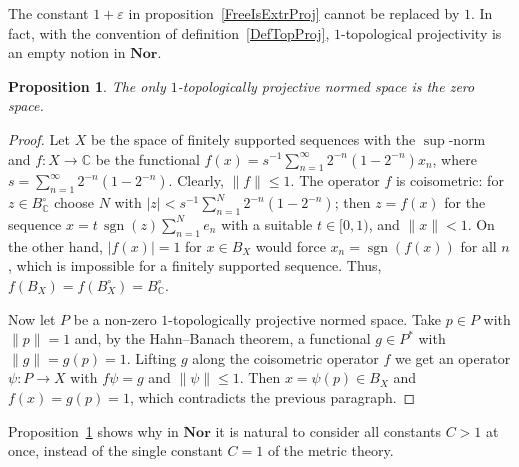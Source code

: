\documentclass[12pt]{article}
\newtheorem{proposition}[theorem]{Proposition}
\newcommand{\Nor}{\mathbf{Nor}}
\newcommand{\norm}[1]{\lVert #1\rVert}
\begin{document}
The constant $1+\varepsilon$ in proposition~\ref{FreeIsExtrProj} cannot be
replaced by $1$. In fact, with the convention of
definition~\ref{DefTopProj}, $1$-topological projectivity is an empty notion
in $\Nor$.

\begin{proposition}\label{NoOneTopProj} The only $1$-topologically projective
    normed space is the zero space.
\end{proposition}
\begin{proof} Let $X$ be the space of finitely supported sequences with the
    $\sup$-norm and $f:X\to\mathbb{C}$ be the functional
    $f(x)=s^{-1}\sum_{n=1}^\infty 2^{-n}(1-2^{-n})x_n$, where
    $s=\sum_{n=1}^\infty 2^{-n}(1-2^{-n})$. Clearly, $\norm{f}\leq 1$. The
    operator $f$ is coisometric: for $z\in B^\circ_\mathbb{C}$ choose $N$ with
    $|z|<s^{-1}\sum_{n=1}^N 2^{-n}(1-2^{-n})$; then $z=f(x)$ for the sequence
    $x=t\,\operatorname{sgn}(z)\sum_{n=1}^N e_n$ with a suitable $t\in[0,1)$,
    and $\norm{x}<1$. On the other hand, $|f(x)|=1$ for $x\in B_X$ would
    force $x_n=\operatorname{sgn}(f(x))$ for all $n$, which is impossible for
    a finitely supported sequence. Thus, $f(B_X)=f(B_X^\circ)=B^\circ_\mathbb{C}$.

    Now let $P$ be a non-zero $1$-topologically projective normed space. Take
    $p\in P$ with $\norm{p}=1$ and, by the Hahn--Banach theorem, a functional
    $g\in P^*$ with $\norm{g}=g(p)=1$. Lifting $g$ along the coisometric
    operator $f$ we get an operator $\psi:P\to X$ with $f\psi=g$ and
    $\norm{\psi}\leq 1$. Then $x=\psi(p)\in B_X$ and $f(x)=g(p)=1$, which
    contradicts the previous paragraph.
\end{proof}

Proposition~\ref{NoOneTopProj} shows why in $\Nor$ it is natural to consider
all constants $C>1$ at once, instead of the single constant $C=1$ of the
metric theory.
\end{document}
